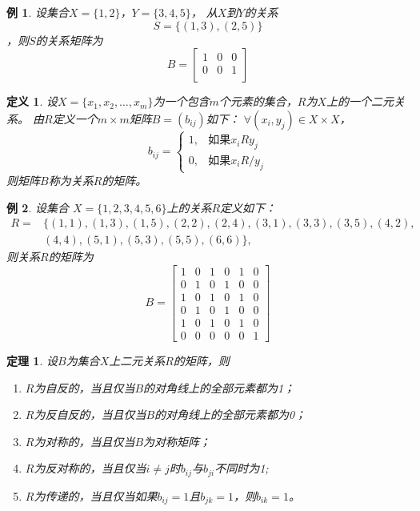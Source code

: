 \documentclass{book}[oneside]
\newtheorem{Def}{定义}[chapter]
\newtheorem{Thm}{定理}[chapter]
\newtheorem{Example}{例}[chapter]
\begin{document}
\begin{CJK*}{UTF8}{gbsn}
  \begin{Example}
    设集合$X=\{1,2\}$，$Y=\{3,4,5\}$， 从$X$到$Y$的关系\[S=\{(1,3), (2, 5)\}\]，则$S$的关系矩阵为
    \[B=\begin{bmatrix}
      1&0&0\\
      0&0&1\\
    \end{bmatrix}
  \]
  \end{Example}
  \begin{Def}
    设$X=\{x_1, x_2, \ldots, x_m\}$为一个包含$m$个元素的集合，$R$为$X$上的一个二元关系。
    由$R$定义一个$m \times m$矩阵$B = (b_{ij})$如下： $\forall (x_i, y_j) \in X \times X$，
\[
    b_{ij}=
      \begin{cases}
        1,&\text{如果}x_iRy_j\\
        0,&\text{如果}x_iR\!\!\! / y_j
      \end{cases}
\]
    则矩阵$B$称为关系$R$的矩阵。
  \end{Def}
  
  \begin{Example}
    设集合
    $X=\{1,2,3,4,5,6 \}$上的关系$R$定义如下：
    \begin{align*}
      R=&\{(1,1),(1,3),(1,5),(2,2),(2,4),(3,1),(3,3),(3,5),(4,2),\\
      &(4,4),(5,1),(5,3),(5,5),(6,6)\},
    \end{align*}
    则关系$R$的矩阵为
    \[B=\begin{bmatrix}
      1&0&1&0&1&0\\
      0&1&0&1&0&0\\
      1&0&1&0&1&0\\
      0&1&0&1&0&0\\
      1&0&1&0&1&0\\
      0&0&0&0&0&1
    \end{bmatrix}
  \]
  \end{Example}

  \begin{Thm}
  设$B$为集合$X$上二元关系$R$的矩阵，则
  \begin{enumerate}
  \item $R$为自反的，当且仅当$B$的对角线上的全部元素都为1；
  \item $R$为反自反的，当且仅当$B$的对角线上的全部元素都为0；
  \item $R$为对称的，当且仅当$B$为对称矩阵；
  \item $R$为反对称的，当且仅当$i \neq j$时$b_{ij}$与$b_{ji}$不同时为1;
  \item $R$为传递的，当且仅当如果$b_{ij}=1$且$b_{jk}=1$，则$b_{ik}=1$。
  \end{enumerate}
\end{Thm}



\end{CJK*}
\end{document}
